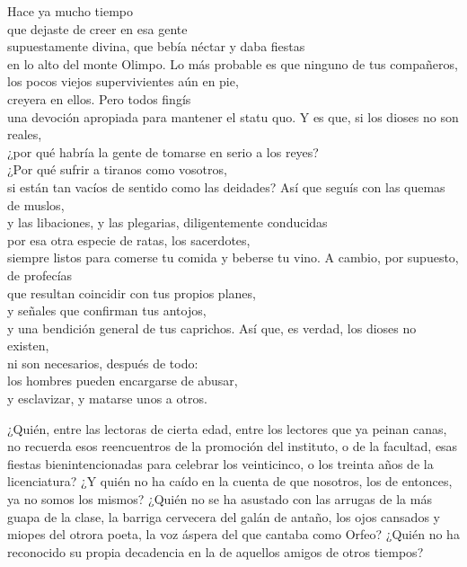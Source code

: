 \begin{versopropio}
Hace ya mucho tiempo\\
que dejaste de creer en esa gente\\
supuestamente divina, que bebía néctar y daba fiestas\\
en lo alto del monte Olimpo.
\stanzabreak
Lo más probable es que ninguno de tus compañeros,\\
los pocos viejos supervivientes aún en pie,\\
creyera en ellos. Pero todos fingís\\
una devoción apropiada para mantener el statu quo.
\stanzabreak
Y es que, si los dioses no son reales,\\
¿por qué habría la gente de tomarse en serio a los reyes?\\
¿Por qué sufrir a tiranos como vosotros,\\
si están tan vacíos de sentido como las deidades?
\stanzabreak
Así que seguís con las quemas de muslos,\\
y las libaciones, y las plegarias, diligentemente conducidas\\
por esa otra especie de ratas, los sacerdotes,\\
siempre listos para comerse tu comida y beberse tu vino.
\stanzabreak
A cambio, por supuesto, de profecías\\
que resultan coincidir con tus propios planes,\\
y señales que confirman tus antojos,\\
y una bendición general de tus caprichos.
\stanzabreak
Así que, es verdad, los dioses no existen,\\
ni son necesarios, después de todo:\\
los hombres pueden encargarse de abusar,\\
y esclavizar, y matarse unos a otros.
\end{versopropio}

¿Quién, entre las lectoras de cierta edad, entre los lectores que ya peinan canas, no recuerda esos reencuentros de la promoción del instituto, o de la facultad, esas fiestas bienintencionadas para celebrar los veinticinco, o los treinta años de la licenciatura? ¿Y quién no ha caído en la cuenta de que nosotros, los de entonces, ya no somos los mismos? ¿Quién no se ha asustado con las arrugas de la más guapa de la clase, la barriga cervecera del galán de antaño, los ojos cansados y miopes del otrora poeta, la voz áspera del que cantaba como Orfeo? ¿Quién no ha reconocido su propia decadencia en la de aquellos amigos de otros tiempos?

